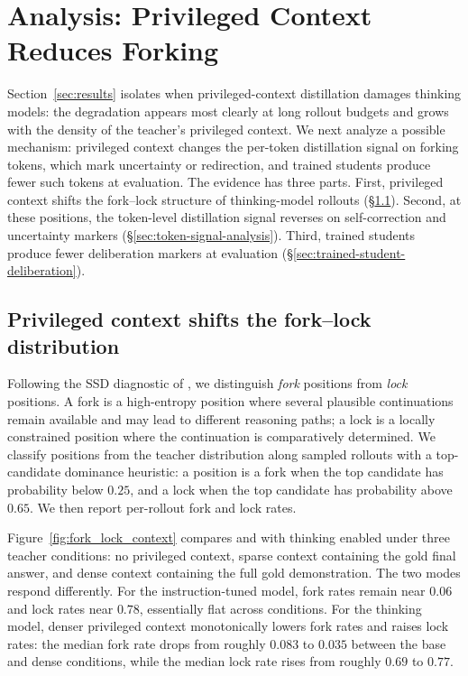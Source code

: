 \section{Analysis: Privileged Context Reduces Forking}
\label{sec:analysis}

Section~\ref{sec:results} isolates when privileged-context distillation damages
thinking models: the degradation appears most clearly at long rollout budgets
and grows with the density of the teacher's privileged context. We next analyze
a possible mechanism: privileged context changes the per-token distillation
signal on forking tokens, which mark uncertainty or redirection, and trained
students produce fewer such tokens at evaluation. The evidence has three
parts. First, privileged context shifts the fork--lock structure of
thinking-model rollouts
(\S\ref{sec:fork-lock-analysis}). Second, at these positions, the token-level
distillation signal reverses on self-correction and uncertainty markers
(\S\ref{sec:token-signal-analysis}). Third, trained \opsd{} students produce
fewer deliberation markers at evaluation
(\S\ref{sec:trained-student-deliberation}).

\subsection{Privileged context shifts the fork--lock distribution}
\label{sec:fork-lock-analysis}

Following the SSD diagnostic of \citet{zhang2026embarrassingly}, we distinguish
\emph{fork} positions from \emph{lock} positions. A fork is a high-entropy
position where several plausible continuations remain available and may lead to
different reasoning paths; a lock is a locally constrained position where the
continuation is comparatively determined. We classify positions from the
teacher distribution along sampled rollouts with a top-candidate dominance
heuristic: a position is a fork when the top candidate has probability below
$0.25$, and a lock when the top candidate has probability above $0.65$. We then
report per-rollout fork and lock rates.



Figure~\ref{fig:fork_lock_context} compares \qwenfourbinstruct{} and
\qwenfourb{} with thinking enabled under three teacher conditions: no
privileged context, sparse context containing the gold final answer, and dense
context containing the full gold demonstration. The two modes respond
differently. For the instruction-tuned model, fork rates remain near $0.06$ and
lock rates near $0.78$, essentially flat across conditions. For the thinking
model, denser privileged context monotonically lowers fork rates and raises
lock rates: the median fork rate drops from roughly $0.083$ to
$0.035$ between the base and dense conditions, while the median lock rate rises
from roughly $0.69$ to $0.77$.

